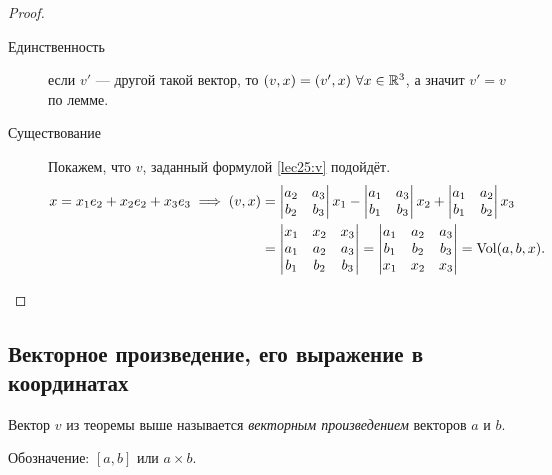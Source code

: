 \begin{proof}~
    \begin{description}
    \item[Единственность] если $v'$ --- другой такой вектор, то $(v, x) = (v', x) \ \forall x \in \RR^3$, а значит $v' = v$ по лемме.
    \item[Существование] Покажем, что $v$, заданный формулой \eqref{lec25:v} подойдёт.
        \begin{align*}
            x = x_1 e_2 + x_2 e_2 + x_3 e_3 \implies (v, x) &= \begin{vmatrix} 
                a_2 & a_3 \\
                b_2 & b_3
            \end{vmatrix} x_1 - \begin{vmatrix} 
                a_1 & a_3 \\
                b_1 & b_3
            \end{vmatrix} x_2 + \begin{vmatrix} 
                a_1 & a_2 \\
                b_1 & b_2
                \end{vmatrix} x_3 \\ &= \begin{vmatrix} 
                x_1 & x_2 & x_3 \\
                a_1 & a_2 & a_3 \\
                b_1 & b_2 & b_3
            \end{vmatrix} = \begin{vmatrix} 
                a_1 & a_2 & a_3 \\
                b_1 & b_2 & b_3 \\
                x_1 & x_2 & x_3
            \end{vmatrix} = \operatorname{\mathop{\mathrm{Vol}}}(a, b, x)
        .\end{align*}
    \end{description}
\end{proof}


\subsection{Векторное произведение, его выражение в координатах}

\begin{definition}
    Вектор $v$ из теоремы выше называется \textit{векторным произведением} векторов $a$ и $b$.

    Обозначение: $[a, b]$ или $a \times b$.
\end{definition}


